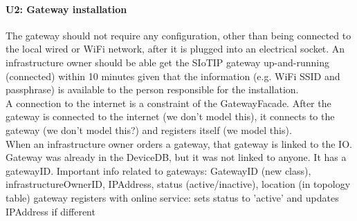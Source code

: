
    \paragraph{U2: Gateway installation}
        The gateway should not require any configuration, other than being connected
        to the local wired or WiFi network, after it is plugged into an electrical
        socket. An infrastructure owner should be able get the SIoTIP gateway
        up-and-running (connected) within 10 minutes given that the information
        (e.g. WiFi SSID and passphrase) is available to the person responsible for
        the installation. \\

        A connection to the internet is a constraint of the GatewayFacade.
        After the gateway is connected to the internet (we don't model this),
        it connects to the gateway (we don't model this?) and registers itself (we model this). \\
        When an infrastructure owner orders a gateway, that gateway is linked to the IO.
        Gateway was already in the DeviceDB, but it was not linked to anyone. It has a gatewayID.
        Important info related to gateways: GatewayID (new class), infrastructureOwnerID, IPAddress, status (active/inactive), location (in topology table)
        gateway registers with online service:
            sets status to 'active' and updates IPAddress if different

